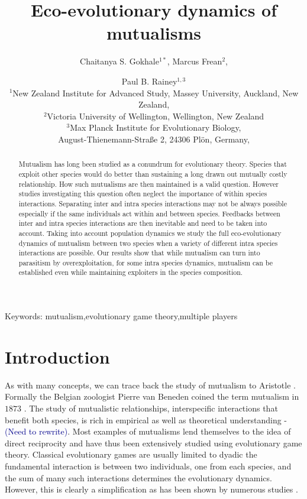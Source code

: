 \documentclass[12pt]{article}
\title{\vspace*{-22mm}\bf Eco-evolutionary dynamics of mutualisms}
\author{Chaitanya S. Gokhale$^{1*}$,
Marcus Frean$^{2}$,
 \and Paul B. Rainey$^{1,3}$ \\
\normalsize $^{1}$New Zealand Institute for Advanced Study, Massey University, Auckland, New Zealand, \\
\normalsize $^2$Victoria University of Wellington, Wellington, New Zealand\\
\normalsize $^3$Max Planck Institute for Evolutionary Biology, \\
\normalsize August-Thienemann-Stra{\ss}e 2, 24306 Pl\"{o}n, Germany,\\
}
\date{}
\newcommand{\cha}[1]{\textcolor{darkblue}{(#1)}}
\begin{document}
\linenumbers
\maketitle

\begin{abstract}
Mutualism has long been studied as a conundrum for evolutionary theory.
Species that exploit other species would do better than sustaining a long drawn out mutually costly relationship.
How such mutualisms are then maintained is a valid question.
However studies investigating this question often neglect the importance of within species interactions.
Separating inter and intra species interactions may not be always possible especially if the same individuals act within and between species.
Feedbacks between inter and intra species interactions are then inevitable and need to be taken into account.
Taking into account population dynamics we study the full eco-evolutionary dynamics of mutualism between two species when a variety of different intra species interactions are possible.
Our results show that while mutualism can turn into parasitism by overexploitation, for some intra species dynamics, mutualism can be established even while maintaining exploiters in the species composition.
\end{abstract}

\noindent
Keywords: mutualism,evolutionary game theory,multiple players

\tableofcontents

\section{Introduction}

As with many concepts, we can trace back the study of mutualism to Aristotle \citep{aristotle:book:350}.
Formally the Belgian zoologist Pierre van Beneden coined the term mutualism in $1873$ \citep{bronstein:book:2003}.
The study of mutualistic relationships, interspecific interactions that benefit both species, is rich in empirical as well as theoretical understanding 
\citep{boucher:book:1985,hinton:PTENHS:1951,wilson:AmNat:1983,bronstein:QRB:1994,pierce:ARE:2002,kiers:Nature:2003,bshary:ASB:2004} \citep{poulin:JTB:1995,doebeli:PNAS:1998,noe:book:2001,johnstone:ECL:2002,bergstrom:PNAS:2003,hoeksema:AmNat:2003,akcay:PRSB:2007,bshary:Nature:2008} - \cha{Need to rewrite}.
Most examples of mutualisms lend themselves to the idea of direct reciprocity \citep{trivers:QRB:1971} and have thus been extensively studied using evolutionary game theory.
Classical evolutionary games are usually limited to dyadic the fundamental interaction is between two individuals, one from each species, and the sum of many such interactions determines the evolutionary dynamics.
However, this is clearly a simplification as has been shown by numerous studies \citep{noe:TREE:1995,noe:book:2001,kiers:Nature:2003,stanton:AmNat:2003,stadler:book:2008}.
\end{document}
